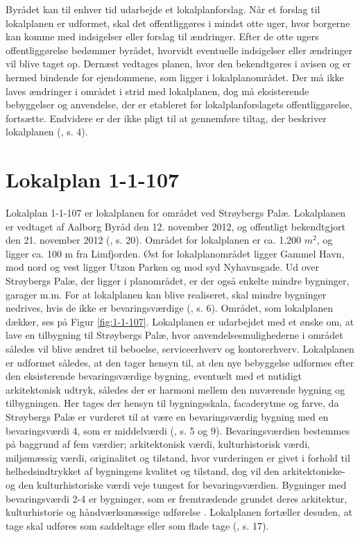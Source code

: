 Byrådet kan til enhver tid udarbejde et lokalplanforslag. Når et forslag til lokalplanen er udformet, skal det offentliggøres i mindst otte uger, hvor borgerne kan komme med indsigelser eller forslag til ændringer. Efter de otte ugers offentliggørelse bedømmer byrådet, hvorvidt eventuelle indsigelser eller ændringer vil blive taget op. Dernæst vedtages planen, hvor den bekendtgøres i avisen og er hermed bindende for ejendommene, som ligger i lokalplanområdet.
\newline \indent{     }  Der må ikke laves ændringer i området i strid med lokalplanen, dog må eksisterende bebyggelser og anvendelse, der er etableret før lokalplanforslagets offentliggørelse, fortsætte. Endvidere er der ikke pligt til at gennemføre tiltag, der beskriver lokalplanen (\citep{lokalplan}, s. 4).

\section{Lokalplan 1-1-107}
Lokalplan 1-1-107 er lokalplanen for området ved Strøybergs Palæ. Lokalplanen er vedtaget af Aalborg Byråd den 12. november 2012, og offentligt bekendtgjort den 21. november 2012 (\citep{lokalplan}, s. 20).
\newline \indent{     }  Området for lokalplanen er ca. 1.200 $m^2$, og ligger ca. 100 m fra Limfjorden. Øst for lokalplanområdet ligger Gammel Havn, mod nord og vest ligger Utzon Parken og mod syd Nyhavnsgade. Ud over Strøybergs Palæ, der ligger i planområdet, er der også enkelte mindre bygninger, garager m.m. For at lokalplanen kan blive realiseret, skal mindre bygninger nedrives, hvis de ikke er bevaringsværdige (\citep{lokalplan}, s. 6). Området, som lokalplanen dækker, ses på Figur \ref{fig:1-1-107}.
\newline \indent{     }  Lokalplanen er udarbejdet med et ønske om, at lave en tilbygning til Strøybergs Palæ, hvor anvendelsesmulighederne i området således vil blive ændret til beboelse, serviceerhverv og kontorerhverv. Lokalplanen er udformet således, at den tager hensyn til, at den nye bebyggelse udformes efter den eksisterende bevaringsværdige bygning, eventuelt med et nutidigt arkitektonisk udtryk, således der er harmoni mellem den nuværende bygning og tilbygningen. Her tages der hensyn til bygningsskala, facaderytme og farve, da Strøybergs Palæ er vurderet til at være en bevaringsværdig bygning med en bevaringsværdi 4, som er middelværdi (\citep{lokalplan}, s. 5 og 9). Bevaringsværdien bestemmes på baggrund af fem værdier; arkitektonisk værdi, kulturhistorisk værdi, miljømæssig værdi, originalitet og tilstand, hvor vurderingen er givet i forhold til helhedsindtrykket af bygningens kvalitet og tilstand, dog vil den arkitektoniske- og den kulturhistoriske værdi veje tungest for bevaringsværdien. Bygninger med bevaringsværdi 2-4 er bygninger, som er fremtrædende grundet deres arkitektur, kulturhistorie og håndværksmæssige udførelse \citep{bevaringsvaerdi}. Lokalplanen fortæller desuden, at tage skal udføres som saddeltage eller som flade tage (\citep{lokalplan}, s. 17).
